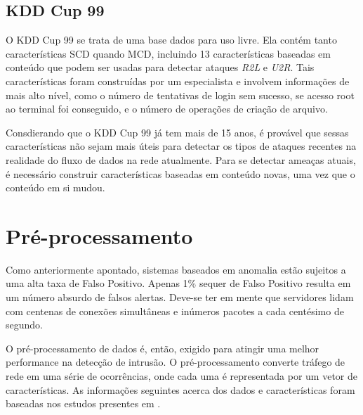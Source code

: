 \subsection{KDD Cup 99}
O KDD Cup 99 se trata de uma base dados para uso livre. Ela contém tanto características SCD quando MCD, incluindo 13
características baseadas em conteúdo que podem ser usadas para detectar ataques \textit{R2L} e \textit{U2R}. Tais características
foram construídas por um especialista e involvem informações de mais alto nível, como o número de tentativas de login
sem sucesso, se acesso root ao terminal foi conseguido, e o número de operações de criação de arquivo.
\par Consdierando que o KDD Cup 99 já tem mais de 15 anos, é provável que sessas características não sejam mais úteis
para detectar os tipos de ataques recentes na realidade do fluxo de dados na rede atualmente. Para se detectar
ameaças atuais, é necessário construir características baseadas em conteúdo novas, uma vez que o conteúdo em si mudou.


\section{Pré-processamento}
Como anteriormente apontado, sistemas baseados em anomalia estão sujeitos a uma alta taxa de Falso Positivo. Apenas
1\% sequer de Falso Positivo resulta em um número absurdo de falsos alertas. Deve-se ter em mente que servidores lidam
com centenas de conexões simultâneas e inúmeros pacotes a cada centésimo de segundo.
\par O pré-processamento de dados é, então, exigido para atingir uma melhor performance na detecção de intrusão.
O pré-processamento converte tráfego de rede em uma série de ocorrências, onde cada uma é representada por um vetor
de características. As informações seguintes acerca dos dados e características foram baseadas nos estudos presentes
em \cite{davis11}.

